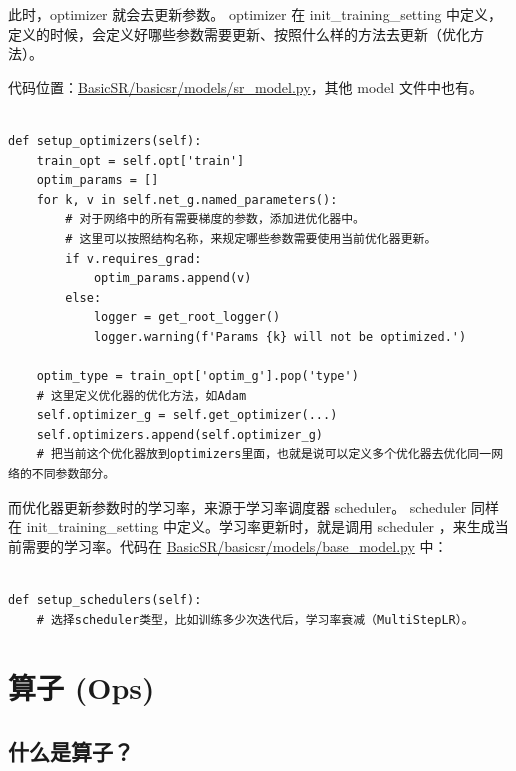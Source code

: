\documentclass[../main.tex]{subfiles}
\begin{document}
此时，optimizer 就会去更新参数。 optimizer 在 init\_training\_setting 中定义，定义的时候，会定义好哪些参数需要更新、按照什么样的方法去更新（优化方法）。

代码位置：\href{https://github.com/XPixelGroup/BasicSR/blob/master/basicsr/models/sr_model.py}{BasicSR/basicsr/models/sr\_model.py}，其他 model 文件中也有。

\begin{verbatim}

def setup_optimizers(self):
    train_opt = self.opt['train']
    optim_params = []
    for k, v in self.net_g.named_parameters():
        # 对于网络中的所有需要梯度的参数，添加进优化器中。
        # 这里可以按照结构名称，来规定哪些参数需要使用当前优化器更新。
        if v.requires_grad:
            optim_params.append(v)
        else:
            logger = get_root_logger()
            logger.warning(f'Params {k} will not be optimized.')

    optim_type = train_opt['optim_g'].pop('type')
    # 这里定义优化器的优化方法，如Adam
    self.optimizer_g = self.get_optimizer(...)
    self.optimizers.append(self.optimizer_g)
    # 把当前这个优化器放到optimizers里面，也就是说可以定义多个优化器去优化同一网络的不同参数部分。
\end{verbatim}

而优化器更新参数时的学习率，来源于学习率调度器 scheduler。 scheduler 同样在 init\_training\_setting 中定义。学习率更新时，就是调用 scheduler ，来生成当前需要的学习率。代码在 \href{https://github.com/XPixelGroup/BasicSR/blob/master/basicsr/models/base_model.py}{BasicSR/basicsr/models/base\_model.py} 中：

\begin{verbatim}

def setup_schedulers(self):
    # 选择scheduler类型，比如训练多少次迭代后，学习率衰减（MultiStepLR）。
\end{verbatim}




\section{算子 (Ops)}\label{code_structure:ops}

\subsection{什么是算子？}
\end{document}
